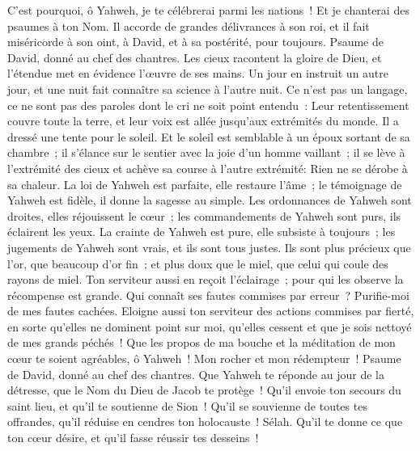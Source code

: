 \begin{multicols}{2}
C'est pourquoi, ô Yahweh, je te célébrerai parmi les nations~! Et je chanterai des psaumes à ton Nom.
Il accorde de grandes délivrances à son roi, et il fait miséricorde à son oint, à David, et à sa postérité, pour toujours.
\VerseOne{}Psaume de David, donné au chef des chantres.
Les cieux racontent la gloire de Dieu, et l'étendue met en évidence l'œuvre de ses mains.
Un jour en instruit un autre jour, et une nuit fait connaître sa science à l'autre nuit.
Ce n'est pas un langage, ce ne sont pas des paroles dont le cri ne soit point entendu~:
Leur retentissement couvre toute la terre, et leur voix est allée jusqu'aux extrémités du monde. Il a dressé une tente pour le soleil.
Et le soleil est semblable à un époux sortant de sa chambre~; il s'élance sur le sentier avec la joie d'un homme vaillant~;
il se lève à l'extrémité des cieux et achève sa course à l'autre extrémité: Rien ne se dérobe à sa chaleur.
La loi de Yahweh est parfaite, elle restaure l'âme~; le témoignage de Yahweh est fidèle, il donne la sagesse au simple.
Les ordonnances de Yahweh sont droites, elles réjouissent le cœur~; les commandements de Yahweh sont purs, ils éclairent les yeux.
La crainte de Yahweh est pure, elle subsiste à toujours~; les jugements de Yahweh sont vrais, et ils sont tous justes.
Ils sont plus précieux que l'or, que beaucoup d'or fin~; et plus doux que le miel, que celui qui coule des rayons de miel.
Ton serviteur aussi en reçoit l'éclairage~; pour qui les observe la récompense est grande.
Qui connaît ses fautes commises par erreur~? Purifie-moi de mes fautes cachées.
Eloigne aussi ton serviteur des actions commises par fierté, en sorte qu'elles ne dominent point sur moi, qu'elles cessent et que je sois nettoyé de mes grands péchés~!
Que les propos de ma bouche et la méditation de mon cœur te soient agréables, ô Yahweh~! Mon rocher et mon rédempteur~!
\VerseOne{}Psaume de David, donné au chef des chantres.
Que Yahweh te réponde au jour de la détresse, que le Nom du Dieu de Jacob te protège~!
Qu'il envoie ton secours du saint lieu, et qu'il te soutienne de Sion~!
Qu'il se souvienne de toutes tes offrandes, qu'il réduise en cendres ton holocauste~! Sélah.
Qu'il te donne ce que ton cœur désire, et qu'il fasse réussir tes desseins~!

\end{multicols}
